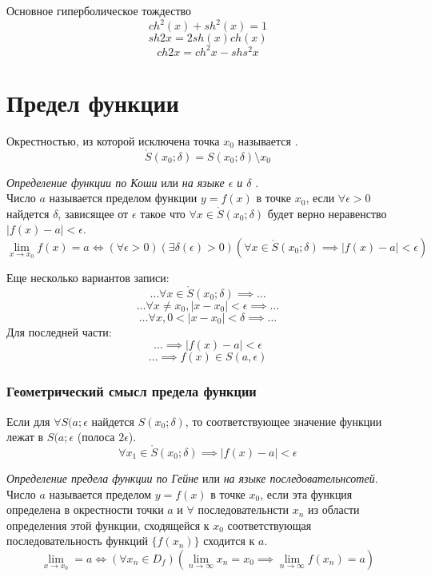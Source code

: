 Основное гиперболическое тождество
\[
  ch^2(x) + sh^2(x) = 1
\]
\[
  sh 2x = 2sh(x) ch(x)
\] 
\[
  ch 2x = ch^2x - shs^2x
\] 
\section{Предел функции}

\begin{definition}
  Окрестностью, из которой исключена точка $x_{0}$ называется .
  \[
    \mathring{S}(x_0; \delta) = S(x_0; \delta) \setminus {x_0}
  \] 
\end{definition}

\begin{definition}
  \textit{Определение функции по Коши} или \textit{на языке $\epsilon$ и $\delta$ }. \\
  Число $a$ называется пределом функции $y = f\left( x \right) $ в точке $x_0$, если $\forall \epsilon > 0$ найдется $\delta$, зависящее от  $\epsilon$ такое что $\forall x \in \mathring{S}(x_0; \delta)$ будет верно неравенство $|f\left( x \right) - a| < \epsilon$.
  \[
    \lim_{x \to x_0} f(x) = a \iff (\forall \epsilon > 0)(\exists  \delta(\epsilon) > 0)(\forall  x \in \mathring{S}(x_0; \delta) \implies |f(x) - a| < \epsilon)
  \]

  Еще несколько вариантов записи:
  \[
  \ldots \forall x \in \mathring{S}(x_0; \delta) \implies \ldots
  \] 
  \[
  \ldots \forall x \neq x_0, |x - x_0| < \epsilon \implies \ldots
  \] 
  \[
  \ldots \forall x, 0 < |x - x_0| < \delta \implies \ldots
  \]
  Для последней части:
  \[
  \ldots \implies |f(x) - a| < \epsilon
  \] 
  \[
  \ldots \implies f(x) \in S(a, \epsilon)
  \] 
\end{definition}

\subsubsection*{Геометрический смысл предела функции}


Если для $\forall S(a; \epsilon$ найдется $S(x_0; \delta)$, то соответствующее значение функции лежат в  $S(a; \epsilon$ (полоса $2 \epsilon$).
\[
  \forall x_1 \in \mathring{S}(x_0; \delta) \implies |f(x) - a| < \epsilon
\] 
\begin{definition}
  \textit{Определение предела функции по Гейне} или \textit{на языке последовательнсотей}. \\
  Число $a$ называется пределом $y = f\left( x \right) $ в точке $x_0$, если эта функция определена в окрестности точки $a$ и $\forall$ последовательнсти $x_{n}$ из области определения этой функции, сходящейся к $x_0$ соответствующая последовательность функций $\{f(x_{n})\}$ сходится к $a$.
  \[
  \lim_{x \to x_0} = a \iff (\forall x_{n}\in D_f)(\lim_{n \to \infty} x_{n} = x_0 \implies \lim_{n \to \infty} f(x_{n}) = a) 
  \] 
\end{definition}


